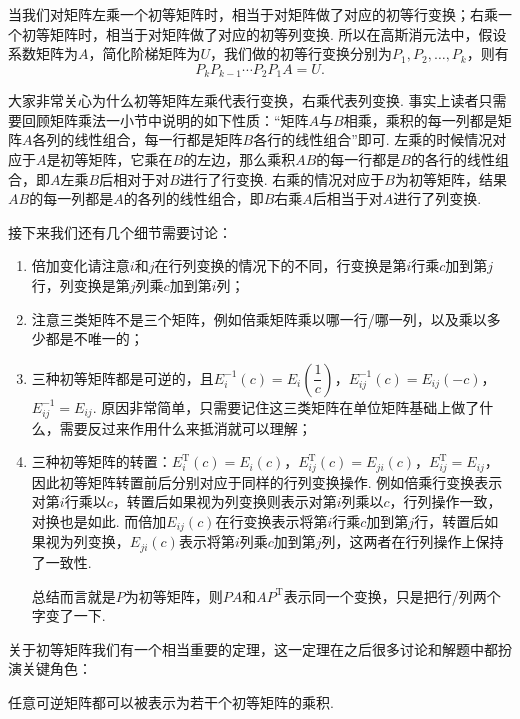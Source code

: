 当我们对矩阵左乘一个初等矩阵时，相当于对矩阵做了对应的初等行变换；右乘一个初等矩阵时，相当于对矩阵做了对应的初等列变换. 所以在高斯消元法中，假设系数矩阵为$A$，简化阶梯矩阵为$U$，我们做的初等行变换分别为$P_1,P_2,\ldots,P_k$，则有
\[P_kP_{k-1}\cdots P_2P_1A=U.\]

大家非常关心为什么初等矩阵左乘代表行变换，右乘代表列变换. 事实上读者只需要回顾矩阵乘法一小节中说明的如下性质：``矩阵$A$与$B$相乘，乘积的每一列都是矩阵$A$各列的线性组合，每一行都是矩阵$B$各行的线性组合''即可. 左乘的时候情况对应于$A$是初等矩阵，它乘在$B$的左边，那么乘积$AB$的每一行都是$B$的各行的线性组合，即$A$左乘$B$后相对于对$B$进行了行变换. 右乘的情况对应于$B$为初等矩阵，结果$AB$的每一列都是$A$的各列的线性组合，即$B$右乘$A$后相当于对$A$进行了列变换.

接下来我们还有几个细节需要讨论：
\begin{enumerate}
    \item 倍加变化请注意$i$和$j$在行列变换的情况下的不同，行变换是第$i$行乘$c$加到第$j$行，列变换是第$j$列乘$c$加到第$i$列；

    \item 注意三类矩阵不是三个矩阵，例如倍乘矩阵乘以哪一行/哪一列，以及乘以多少都是不唯一的；

    \item 三种初等矩阵都是可逆的，且$E_i^{-1}(c)=E_i\left(\dfrac{1}{c}\right)$，$E_{ij}^{-1}(c)=E_{ij}(-c)$，$E_{ij}^{-1}=E_{ij}$. 原因非常简单，只需要记住这三类矩阵在单位矩阵基础上做了什么，需要反过来作用什么来抵消就可以理解；

    \item 三种初等矩阵的转置：$E_i^\mathrm{T}(c)=E_i(c)$，$E_{ij}^\mathrm{T}(c)=E_{ji}(c)$，$E_{ij}^\mathrm{T}=E_{ij}$，因此初等矩阵转置前后分别对应于同样的行列变换操作. 例如倍乘行变换表示对第$i$行乘以$c$，转置后如果视为列变换则表示对第$i$列乘以$c$，行列操作一致，对换也是如此. 而倍加$E_{ij}(c)$在行变换表示将第$i$行乘$c$加到第$j$行，转置后如果视为列变换，$E_{ji}(c)$表示将第$i$列乘$c$加到第$j$列，这两者在行列操作上保持了一致性.

          总结而言就是$P$为初等矩阵，则$PA$和$AP^\mathrm{T}$表示同一个变换，只是把行/列两个字变了一下.
\end{enumerate}

关于初等矩阵我们有一个相当重要的定理，这一定理在之后很多讨论和解题中都扮演关键角色：
\begin{theorem}\label{thm:10:可逆与初等变换}
    任意可逆矩阵都可以被表示为若干个初等矩阵的乘积.
\end{theorem}

